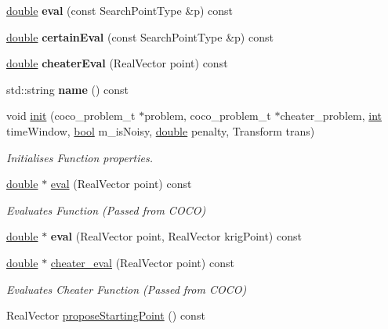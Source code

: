 \begin{DoxyCompactItemize}
\item 
\hyperlink{classdouble}{double} {\bfseries eval} (const Search\+Point\+Type \&p) const \hypertarget{classUncertainFunc__s_a90e792ce261171c86aa337917f091f50}{}\label{classUncertainFunc__s_a90e792ce261171c86aa337917f091f50}

\item 
\hyperlink{classdouble}{double} {\bfseries certain\+Eval} (const Search\+Point\+Type \&p) const \hypertarget{classUncertainFunc__s_a8df8e383e443d1aabdadc28c1c665098}{}\label{classUncertainFunc__s_a8df8e383e443d1aabdadc28c1c665098}

\item 
\hyperlink{classdouble}{double} {\bfseries cheater\+Eval} (Real\+Vector point) const \hypertarget{classUncertainFunc__s_ad0384e715ad41107fdaf02dddc305398}{}\label{classUncertainFunc__s_ad0384e715ad41107fdaf02dddc305398}

\item 
std\+::string {\bfseries name} () const \hypertarget{classUncertainFunc__s_a7c59e5cd6293ecd57cc26dbf201290b2}{}\label{classUncertainFunc__s_a7c59e5cd6293ecd57cc26dbf201290b2}

\item 
void \hyperlink{classCOCOfunc_aef35b3b037b11a843bb77fd269f5447f}{init} (coco\+\_\+problem\+\_\+t $\ast$problem, coco\+\_\+problem\+\_\+t $\ast$cheater\+\_\+problem, \hyperlink{classint}{int} time\+Window, \hyperlink{classbool}{bool} m\+\_\+is\+Noisy, \hyperlink{classdouble}{double} penalty, Transform trans)
\begin{DoxyCompactList}\small\item\em Initialises Function properties. \end{DoxyCompactList}\item 
\hyperlink{classdouble}{double} $\ast$ \hyperlink{classCOCOfunc_af59cef4f0a78c07c4910bf015363c3f5}{eval} (Real\+Vector point) const
\begin{DoxyCompactList}\small\item\em Evaluates Function (Passed from C\+O\+CO) \end{DoxyCompactList}\item 
\hyperlink{classdouble}{double} $\ast$ {\bfseries eval} (Real\+Vector point, Real\+Vector krig\+Point) const\hypertarget{classCOCOfunc_a5212e78af436dfe41259bf21217cb80b}{}\label{classCOCOfunc_a5212e78af436dfe41259bf21217cb80b}

\item 
\hyperlink{classdouble}{double} $\ast$ \hyperlink{classCOCOfunc_aaf37b734aed084757a8ccf5ad4d66705}{cheater\+\_\+eval} (Real\+Vector point) const
\begin{DoxyCompactList}\small\item\em Evaluates Cheater Function (Passed from C\+O\+CO) \end{DoxyCompactList}\item 
Real\+Vector \hyperlink{classCOCOfunc_a2a5d8bccb6235159b8f28be24c989d07}{propose\+Starting\+Point} () const\hypertarget{classCOCOfunc_a2a5d8bccb6235159b8f28be24c989d07}{}\label{classCOCOfunc_a2a5d8bccb6235159b8f28be24c989d07}


\end{DoxyCompactItemize}

